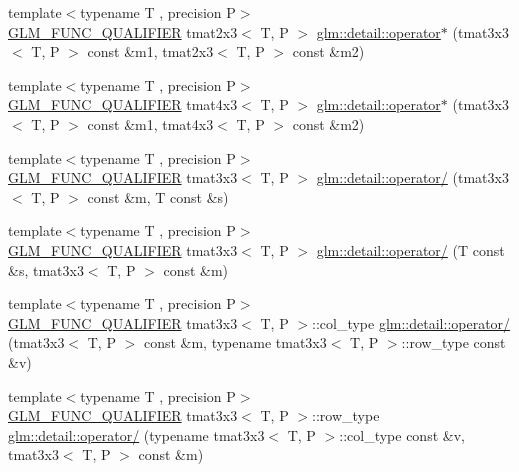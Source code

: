 \begin{DoxyCompactItemize}
\item 
{\footnotesize template$<$typename T , precision P$>$ }\\\hyperlink{setup_8hpp_a33fdea6f91c5f834105f7415e2a64407}{G\+L\+M\+\_\+\+F\+U\+N\+C\+\_\+\+Q\+U\+A\+L\+I\+F\+I\+ER} tmat2x3$<$ T, P $>$ \hyperlink{namespaceglm_1_1detail_afc229bfd70b024f44984d963a2ce290a}{glm\+::detail\+::operator$\ast$} (tmat3x3$<$ T, P $>$ const \&m1, tmat2x3$<$ T, P $>$ const \&m2)
\item 
{\footnotesize template$<$typename T , precision P$>$ }\\\hyperlink{setup_8hpp_a33fdea6f91c5f834105f7415e2a64407}{G\+L\+M\+\_\+\+F\+U\+N\+C\+\_\+\+Q\+U\+A\+L\+I\+F\+I\+ER} tmat4x3$<$ T, P $>$ \hyperlink{namespaceglm_1_1detail_a3036c67ab910bec407bcbf6ac9348d80}{glm\+::detail\+::operator$\ast$} (tmat3x3$<$ T, P $>$ const \&m1, tmat4x3$<$ T, P $>$ const \&m2)
\item 
{\footnotesize template$<$typename T , precision P$>$ }\\\hyperlink{setup_8hpp_a33fdea6f91c5f834105f7415e2a64407}{G\+L\+M\+\_\+\+F\+U\+N\+C\+\_\+\+Q\+U\+A\+L\+I\+F\+I\+ER} tmat3x3$<$ T, P $>$ \hyperlink{namespaceglm_1_1detail_af8ef0585d305bc08cb1927dc6e864b26}{glm\+::detail\+::operator/} (tmat3x3$<$ T, P $>$ const \&m, T const \&s)
\item 
{\footnotesize template$<$typename T , precision P$>$ }\\\hyperlink{setup_8hpp_a33fdea6f91c5f834105f7415e2a64407}{G\+L\+M\+\_\+\+F\+U\+N\+C\+\_\+\+Q\+U\+A\+L\+I\+F\+I\+ER} tmat3x3$<$ T, P $>$ \hyperlink{namespaceglm_1_1detail_aacbf3ae6eec58a3fc3e2b9ccc4b67b05}{glm\+::detail\+::operator/} (T const \&s, tmat3x3$<$ T, P $>$ const \&m)
\item 
{\footnotesize template$<$typename T , precision P$>$ }\\\hyperlink{setup_8hpp_a33fdea6f91c5f834105f7415e2a64407}{G\+L\+M\+\_\+\+F\+U\+N\+C\+\_\+\+Q\+U\+A\+L\+I\+F\+I\+ER} tmat3x3$<$ T, P $>$\+::col\+\_\+type \hyperlink{namespaceglm_1_1detail_ade2ff052a542a20a447c4fdb1dd62e28}{glm\+::detail\+::operator/} (tmat3x3$<$ T, P $>$ const \&m, typename tmat3x3$<$ T, P $>$\+::row\+\_\+type const \&v)
\item 
{\footnotesize template$<$typename T , precision P$>$ }\\\hyperlink{setup_8hpp_a33fdea6f91c5f834105f7415e2a64407}{G\+L\+M\+\_\+\+F\+U\+N\+C\+\_\+\+Q\+U\+A\+L\+I\+F\+I\+ER} tmat3x3$<$ T, P $>$\+::row\+\_\+type \hyperlink{namespaceglm_1_1detail_a5091f02efd6b3ab3b62ae61200902542}{glm\+::detail\+::operator/} (typename tmat3x3$<$ T, P $>$\+::col\+\_\+type const \&v, tmat3x3$<$ T, P $>$ const \&m)

\end{DoxyCompactItemize}

